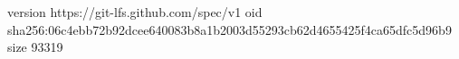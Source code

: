 version https://git-lfs.github.com/spec/v1
oid sha256:06c4ebb72b92dcee640083b8a1b2003d55293cb62d4655425f4ca65dfc5d96b9
size 93319
